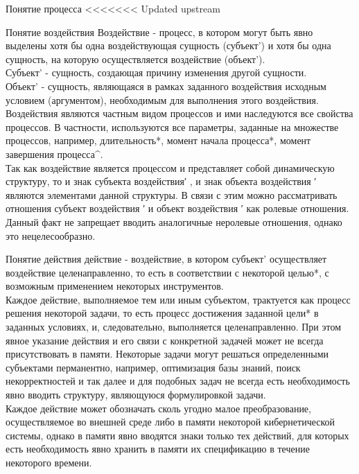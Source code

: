 \begin{frame}{\large Понятие процесса}
<<<<<<< Updated upstream
\begin{frame}{\large Понятие воздействия}
\vspace{23}
    Воздействие - процесс, в котором могут быть явно выделены хотя бы одна воздействующая сущность (субъект') и хотя бы одна сущность, на которую осуществляется воздействие (объект').\\
    Субъект' - сущность, создающая причину изменения другой сущности.\\
    Объект' - сущность, являющаяся в рамках заданного воздействия исходным условием (аргументом), необходимым для выполнения этого воздействия.\\
    Воздействия являются частным видом процессов и ими наследуются все свойства процессов. В частности, используются все параметры, заданные на множестве процессов, например, длительность*, момент начала процесса*, момент завершения процесса^.\\
    Так как воздействие является процессом и представляет собой динамическую структуру, то и знак субъекта воздействия′ , и знак объекта воздействия ′ являются элементами данной структуры. В связи с этим можно рассматривать отношения субъект воздействия ′ и объект воздействия ′ как ролевые отношения. Данный факт не запрещает вводить аналогичные неролевые отношения, однако это нецелесообразно.
\end{frame}

\begin{frame}{\large Понятие действия}
\vspace{23}
    действие - воздействие, в котором субъект' осуществляет воздействие целенаправленно, то есть в соответствии с некоторой целью*, с возможным применением некоторых инструментов.\\
    Каждое действие, выполняемое тем или иным субъектом, трактуется как процесс решения некоторой задачи, то есть процесс достижения заданной цели* в заданных условиях, и, следовательно, выполняется целенаправленно. При этом явное указание действия и его связи с конкретной задачей может не всегда присутствовать в памяти. Некоторые задачи могут решаться определенными субъектами перманентно, например, оптимизация базы знаний, поиск некорректностей и так далее и для подобных задач не всегда есть необходимость явно вводить структуру, являющуюся формулировкой задачи.\\ 
    Каждое действие может обозначать сколь угодно малое преобразование, осуществляемое во внешней среде либо в памяти некоторой кибернетической системы, однако в памяти явно вводятся знаки только тех действий, для которых есть необходимость явно хранить в памяти их спецификацию в течение некоторого времени.
\end{frame}


\end{frame}
